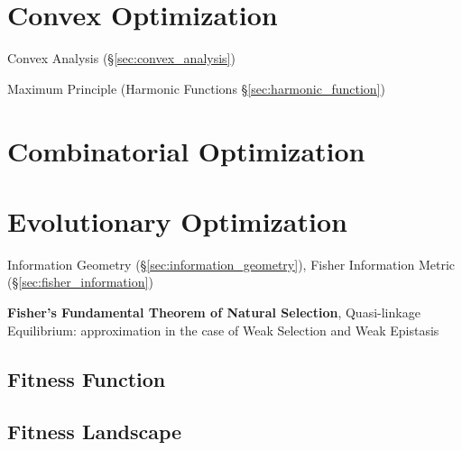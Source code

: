 \section{Convex Optimization}\label{sec:convex_optimization}

Convex Analysis (\S\ref{sec:convex_analysis})

Maximum Principle (Harmonic Functions \S\ref{sec:harmonic_function})



\section{Combinatorial Optimization}
\label{sec:combinatorial_optimization}

\section{Evolutionary Optimization}\label{sec:evolutionary_optimization}

\fist Information Geometry (\S\ref{sec:information_geometry}), Fisher
Information Metric (\S\ref{sec:fisher_information})

\fist \textbf{Fisher's Fundamental Theorem of Natural Selection},
Quasi-linkage Equilibrium: approximation in the case of Weak Selection
and Weak Epistasis %



\subsection{Fitness Function}\label{sec:fitness_function}

\subsection{Fitness Landscape}\label{sec:fitness_landscape}

